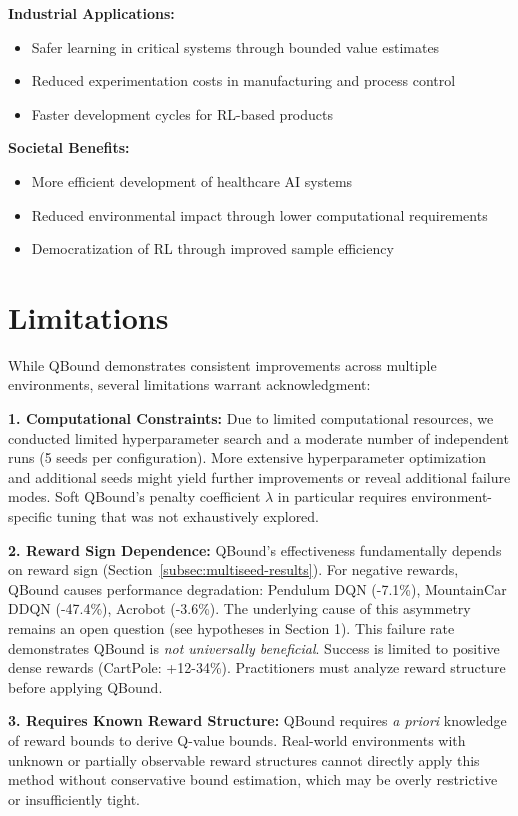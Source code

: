 \documentclass[11pt]{article}
\theoremstyle{definition}
\theoremstyle{remark}
\begin{document}
\textbf{Industrial Applications:}
\begin{itemize}
    \item Safer learning in critical systems through bounded value estimates
    \item Reduced experimentation costs in manufacturing and process control
    \item Faster development cycles for RL-based products
\end{itemize}

\textbf{Societal Benefits:}
\begin{itemize}
    \item More efficient development of healthcare AI systems
    \item Reduced environmental impact through lower computational requirements
    \item Democratization of RL through improved sample efficiency
\end{itemize}

\section{Limitations}

While QBound demonstrates consistent improvements across multiple environments, several limitations warrant acknowledgment:

\textbf{1. Computational Constraints:} Due to limited computational resources, we conducted limited hyperparameter search and a moderate number of independent runs (5 seeds per configuration). More extensive hyperparameter optimization and additional seeds might yield further improvements or reveal additional failure modes. Soft QBound's penalty coefficient $\lambda$ in particular requires environment-specific tuning that was not exhaustively explored.

\textbf{2. Reward Sign Dependence:} QBound's effectiveness fundamentally depends on reward sign (Section~\ref{subsec:multiseed-results}). For negative rewards, QBound causes performance degradation: Pendulum DQN (-7.1\%), MountainCar DDQN (-47.4\%), Acrobot (-3.6\%). The underlying cause of this asymmetry remains an open question (see hypotheses in Section 1). This failure rate demonstrates QBound is \textit{not universally beneficial}. Success is limited to positive dense rewards (CartPole: +12-34\%). Practitioners must analyze reward structure before applying QBound.

\textbf{3. Requires Known Reward Structure:} QBound requires \textit{a priori} knowledge of reward bounds to derive Q-value bounds. Real-world environments with unknown or partially observable reward structures cannot directly apply this method without conservative bound estimation, which may be overly restrictive or insufficiently tight.
\end{document}
